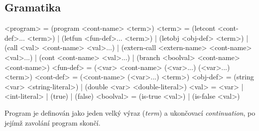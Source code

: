 \subsection{Gramatika}

\begin{ttcode}
<program>   = (program <cont-name> <term>)
<term>      = (letcont <cont-def>... <term>)
            | (letfun <fun-def>... <term>)
            | (letobj <obj-def> <term>)
            | (call <val> <cont-name> <val>...)
            | (extern-call <extern-name> <cont-name> <val>...)
            | (cont <cont-name> <val>...)
            | (branch <boolval> <cont-name> <cont-name>)
<fun-def>   = (<var> <cont-name> (<var>...) (<var>...) <term>)
<cont-def>  = (<cont-name> (<var>...) <term>)
<obj-def>   = (string <var> <string-literal>)
            | (double <var> <double-literal>)
<val>       = <var> | <int-literal> | (true) | (false)
<boolval>   = (is-true <val>) | (is-false <val>)
\end{ttcode}


Program je definován jako jeden velký výraz (\emph{term}) a ukončovací
\emph{continuation}, po jejímž zavolání program skončí.

